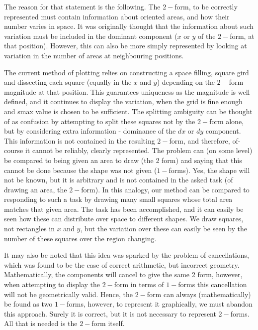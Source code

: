 \documentclass[12pt]{report}
\begin{document}
The reason for that statement is the following. The $2-$form, to be correctly represented must contain information about oriented areas, and how their number varies in space. It was originally thought that the information about such variation must be included in the dominant component ($x$ or $y$ of the $2-$form, at that position). However, this can also be more simply represented by looking at variation in the number of areas at neighbouring positions.

The current method of plotting relies on constructing a space filling, square gird and dissecting each square (equally in the $x$ and $y$) depending on the $2-$form magnitude at that position. This guarantees uniqueness as the magnitude is well defined, and it continues to display the variation, when the grid is fine enough and s\textunderscore max value is chosen to be sufficient.
The splitting ambiguity can be thought of as confusion by attempting to split these squares not by the $2-$form alone, but by considering extra information - dominance of the $dx$ or $dy$ component. This information is not contained in the resulting $2-$form, and therefore, of-course it cannot be reliably, clearly represented.
The problem can (on some level) be compared to being given an area to draw (the 2 form) and saying that this cannot be done because the shape was not given ($1-$forms). Yes, the shape will not be known, but it is arbitrary and is not contained in the asked task (of drawing an area, the $2-$form). In this analogy, our method can be compared to responding to such a task by drawing many small squares whose total area matches that given area. The task has been accomplished, and it can easily be seen how these can distribute over space to different shapes. We draw squares, not rectangles in $x$ and $y$, but the variation over these can easily be seen by the number of these squares over the region changing.

It may also be noted that this idea was sparked by the problem of cancellations, which was found to be the case of correct arithmetic, but incorrect geometry. Mathematically, the components will cancel to give the same 2 form, however, when attempting to display the $2-$form in terms of $1-$forms this cancellation will not be geometrically valid.
Hence, the $2-$form can always (mathematically) be found as two $1-$forms, however, to represent it graphically, we must abandon this approach. Surely it is correct, but it is not necessary to represent $2-$forms. All that is needed is the $2-$form itself.
\end{document}
